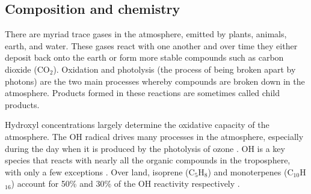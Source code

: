     
  \subsection{Composition and chemistry}
  \label{LR:Atmos:Chem}
        
    There are myriad trace gases in the atmosphere, emitted by plants, animals, 
    earth, and water. 
    These gases react with one another and over time they either deposit back 
    onto the earth or form more stable compounds such as carbon dioxide 
    (CO$_2$).
    Oxidation and photolysis (the process of being broken apart by photons) are the two main processes whereby compounds are broken down in the atmosphere.
    Products formed in these reactions are sometimes called child products.
    
    Hydroxyl  concentrations largely determine the oxidative capacity of the atmosphere.
    The OH radical drives many processes in the atmosphere, especially during the day when it is produced by the photolysis of ozone \parencite{Atkinson2000}.
    OH is a key species that reacts with nearly all the organic compounds in the troposphere, with only a few exceptions \parencite{Atkinson2000}.
    Over land, isoprene (C$_5$H$_8$) and monoterpenes (C$_{10}$H$_{16}$) account for 50\% and 30\% of the OH reactivity respectively \parencite{Fuentes2000}.
    
